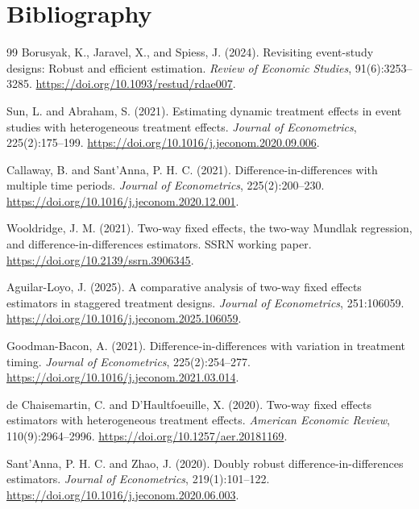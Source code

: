 \documentclass[11pt]{article}
\theoremstyle{definition}
\theoremstyle{plain}
\theoremstyle{remark}
\begin{document}
\section*{Bibliography}
\begin{thebibliography}{99}
Borusyak, K., Jaravel, X., and Spiess, J. (2024).
Revisiting event-study designs: Robust and efficient estimation.
\emph{Review of Economic Studies}, 91(6):3253--3285.
\url{https://doi.org/10.1093/restud/rdae007}.

Sun, L. and Abraham, S. (2021).
Estimating dynamic treatment effects in event studies with heterogeneous treatment effects.
\emph{Journal of Econometrics}, 225(2):175--199.
\url{https://doi.org/10.1016/j.jeconom.2020.09.006}.

Callaway, B. and Sant'Anna, P. H. C. (2021).
Difference-in-differences with multiple time periods.
\emph{Journal of Econometrics}, 225(2):200--230.
\url{https://doi.org/10.1016/j.jeconom.2020.12.001}.

Wooldridge, J. M. (2021).
Two-way fixed effects, the two-way Mundlak regression, and difference-in-differences estimators.
SSRN working paper.
\url{https://doi.org/10.2139/ssrn.3906345}.

Aguilar-Loyo, J. (2025).
A comparative analysis of two-way fixed effects estimators in staggered treatment designs.
\emph{Journal of Econometrics}, 251:106059.
\url{https://doi.org/10.1016/j.jeconom.2025.106059}.

Goodman-Bacon, A. (2021).
Difference-in-differences with variation in treatment timing.
\emph{Journal of Econometrics}, 225(2):254--277.
\url{https://doi.org/10.1016/j.jeconom.2021.03.014}.

de Chaisemartin, C. and D'Haultfoeuille, X. (2020).
Two-way fixed effects estimators with heterogeneous treatment effects.
\emph{American Economic Review}, 110(9):2964--2996.
\url{https://doi.org/10.1257/aer.20181169}.

Sant'Anna, P. H. C. and Zhao, J. (2020).
Doubly robust difference-in-differences estimators.
\emph{Journal of Econometrics}, 219(1):101--122.
\url{https://doi.org/10.1016/j.jeconom.2020.06.003}.


\end{thebibliography}
\end{document}
